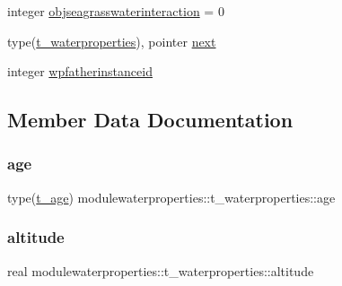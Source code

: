 \begin{DoxyCompactItemize}
\item 
integer \mbox{\hyperlink{structmodulewaterproperties_1_1t__waterproperties_a2f423d314574fb9aad9d8f23497cfa10}{objseagrasswaterinteraction}} = 0
\item 
type(\mbox{\hyperlink{structmodulewaterproperties_1_1t__waterproperties}{t\+\_\+waterproperties}}), pointer \mbox{\hyperlink{structmodulewaterproperties_1_1t__waterproperties_a094d9471c28eed5b46b5745a8f96f6e5}{next}}
\item 
integer \mbox{\hyperlink{structmodulewaterproperties_1_1t__waterproperties_acd27c32b66d9bef6c7c39663656a6d03}{wpfatherinstanceid}}
\end{DoxyCompactItemize}


\subsection{Member Data Documentation}
\mbox{\label{structmodulewaterproperties_1_1t__waterproperties_a43599847567a366c3a74bdbd059d213a}} 
\subsubsection{\texorpdfstring{age}{age}}
{\footnotesize\ttfamily type(\mbox{\hyperlink{structmodulewaterproperties_1_1t__age}{t\+\_\+age}}) modulewaterproperties\+::t\+\_\+waterproperties\+::age\hspace{0.3cm}{\ttfamily [private]}}

\mbox{\label{structmodulewaterproperties_1_1t__waterproperties_a2e6b8eb5dcfdef3132cbc141064e2c7b}} 
\subsubsection{\texorpdfstring{altitude}{altitude}}
{\footnotesize\ttfamily real modulewaterproperties\+::t\+\_\+waterproperties\+::altitude\hspace{0.3cm}{\ttfamily [private]}}

